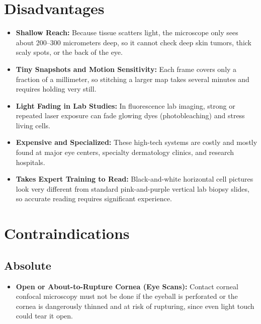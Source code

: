 \section{Disadvantages}
\begin{itemize}
    \item \textbf{Shallow Reach:} Because tissue scatters light, the microscope only sees about 200--300 micrometers deep, so it cannot check deep skin tumors, thick scaly spots, or the back of the eye.
    \item \textbf{Tiny Snapshots and Motion Sensitivity:} Each frame covers only a fraction of a millimeter, so stitching a larger map takes several minutes and requires holding very still.
    \item \textbf{Light Fading in Lab Studies:} In fluorescence lab imaging, strong or repeated laser exposure can fade glowing dyes (photobleaching) and stress living cells.
    \item \textbf{Expensive and Specialized:} These high-tech systems are costly and mostly found at major eye centers, specialty dermatology clinics, and research hospitals.
    \item \textbf{Takes Expert Training to Read:} Black-and-white horizontal cell pictures look very different from standard pink-and-purple vertical lab biopsy slides, so accurate reading requires significant experience.
\end{itemize}

\section{Contraindications}

\subsection{Absolute}
\begin{itemize}
    \item \textbf{Open or About-to-Rupture Cornea (Eye Scans):} Contact corneal confocal microscopy must not be done if the eyeball is perforated or the cornea is dangerously thinned and at risk of rupturing, since even light touch could tear it open.
\end{itemize}

